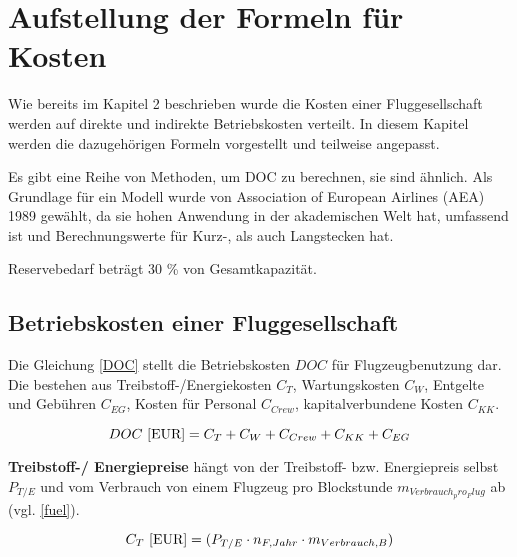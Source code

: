 \section{Aufstellung der Formeln für Kosten}
\label{s:Aufstellung der Formeln für Kosten}

Wie bereits im Kapitel 2 beschrieben wurde die Kosten einer Fluggesellschaft werden auf direkte und indirekte Betriebskosten verteilt.
In diesem Kapitel werden die dazugehörigen Formeln vorgestellt und teilweise angepasst. 

Es gibt eine Reihe von Methoden, um DOC zu berechnen, sie sind ähnlich.
Als Grundlage für ein Modell wurde von Association of European Airlines (AEA) 1989 gewählt, da sie hohen Anwendung in der akademischen Welt hat,
umfassend ist und Berechnungswerte für Kurz-, als auch Langstecken hat.

Reservebedarf beträgt 30 \% von Gesamtkapazität.



\subsection{Betriebskosten einer Fluggesellschaft}

Die Gleichung \eqref{DOC} stellt die Betriebskosten $DOC$ für Flugzeugbenutzung dar. Die bestehen aus Treibstoff-/Energiekosten $C_T$, 
Wartungskosten $C_W$, Entgelte und Gebühren $C_{EG}$, Kosten für Personal $C_{Crew}$, kapitalverbundene Kosten $C_{KK}$.


\begin{equation}
     {DOC ~[\text{EUR}]} = C_T + C_W + C_{Crew} + C_{KK} + C_{EG} \\
     \label{DOC}
  \end{equation}

\textbf{Treibstoff-/ Energiepreise} hängt von der Treibstoff- bzw. Energiepreis selbst \\ $P_{T/E}$ und vom Verbrauch 
von einem Flugzeug pro Blockstunde $m_{Verbrauch_pro_Flug}$ ab (vgl. \eqref{fuel}).



\begin{equation}
   {C_T ~[\text{EUR}]} = (P_{T/E} \cdot n_{F,Jahr} \cdot m_{Verbrauch,B}) \\
   \label{fuel}
\end{equation}

